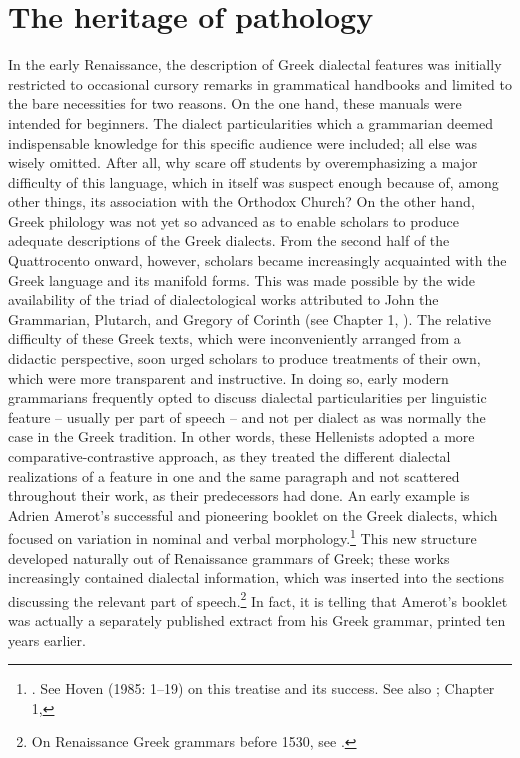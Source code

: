 \section{The heritage of pathology}

In the early Renaissance, the description of Greek dialectal features was initially restricted to occasional cursory remarks in grammatical handbooks and limited to the bare necessities for two reasons. On the one hand, these manuals were intended for beginners. The dialect particularities which a grammarian deemed indispensable knowledge for this specific audience were included; all else was wisely omitted. After all, why scare off students by overemphasizing a major difficulty of this language, which in itself was suspect enough because of, among other things, its association with the Orthodox Church? On the other hand, Greek philology was not yet so advanced as to enable scholars to produce adequate descriptions of the Greek dialects. From the second half of the Quattrocento onward, however, scholars became increasingly acquainted with the Greek language and its manifold forms. This was made possible by the wide availability of the triad of dialectological works attributed to John the Grammarian, Plutarch, and Gregory of Corinth (see Chapter 1, ). The relative difficulty of these Greek texts, which were inconveniently arranged from a didactic perspective, soon urged scholars to produce treatments of their own, which were more transparent and instructive. In doing so, early modern grammarians frequently opted to discuss dialectal particularities per linguistic feature – usually per part of speech – and not per dialect as was normally the case in the Greek tradition. In other words, these Hellenists adopted a more comparative-contrastive approach, as they treated the different dialectal realizations of a feature in one and the same paragraph and not scattered throughout their work, as their predecessors had done. An early example is Adrien Amerot’s successful and pioneering booklet on the Greek dialects, which focused on variation in nominal and verbal morphology.\footnote{{\citet{Amerot1530}. See Hoven (1985: 1–19) on this treatise and its success. See also \citet{Hummel1999}; Chapter 1, }} This new structure developed naturally out of Renaissance grammars of Greek; these works increasingly contained dialectal information, which was inserted into the sections discussing the relevant part of speech.\footnote{{On Renaissance Greek grammars before 1530, see \citet{Botley2010}.}} In fact, it is telling that Amerot’s booklet was actually a separately published extract from his Greek grammar, printed ten years earlier.

